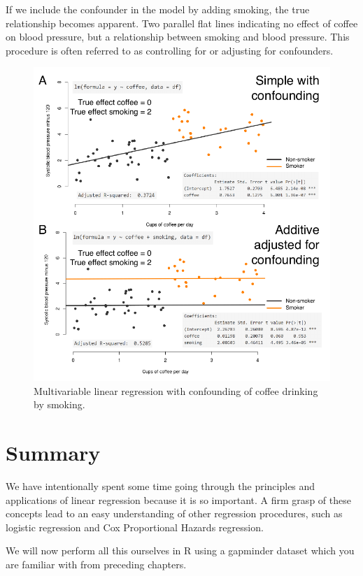 \documentclass[12pt,]{krantz}
\theoremstyle{definition}
\theoremstyle{definition}
\theoremstyle{definition}
\theoremstyle{remark}
\begin{document}
If we include the confounder in the model by adding smoking, the true
relationship becomes apparent. Two parallel flat lines indicating no
effect of coffee on blood pressure, but a relationship between smoking
and blood pressure. This procedure is often referred to as controlling
for or adjusting for confounders.

\begin{figure}
\centering
\includegraphics{images/chapter07/7_confounding.pdf}
\caption{\label{fig:chap07-fig-confounding}Multivariable linear regression
with confounding of coffee drinking by smoking.}
\end{figure}

\hypertarget{summary}{%
\section{Summary}\label{summary}}

We have intentionally spent some time going through the principles and
applications of linear regression because it is so important. A firm
grasp of these concepts lead to an easy understanding of other
regression procedures, such as logistic regression and Cox Proportional
Hazards regression.

We will now perform all this ourselves in R using a gapminder dataset
which you are familiar with from preceding chapters.
\end{document}
